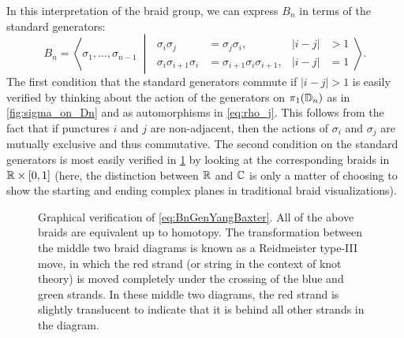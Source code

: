 In this interpretation of the braid group, we can express $B_n$ in terms of the standard generators:
\begin{equation}\label{eq:BnGenYangBaxter}
    B_n = \left\langle \sigma_1,\dots,\sigma_{n-1} \;\middle|\;
    \begin{aligned}
        \sigma_i\sigma_j &= \sigma_j\sigma_i, & |i-j|&>1 \\
        \sigma_i\sigma_{i+1}\sigma_i &= \sigma_{i+1}\sigma_i\sigma_{i+1}, & |i-j|&=1
    \end{aligned}
    \right\rangle.
\end{equation}
The first condition that the standard generators commute if $|i-j|>1$ is easily verified by thinking about the action of the generators on $\pi_1(\mathbb{D}_n)$ as in \cref{fig:sigma_on_Dn} and as automorphisms in \cref{eq:rho_j}. This follows from the fact that if punctures $i$ and $j$ are non-adjacent, then the actions of $\sigma_i$ and $\sigma_j$ are mutually exclusive and thus commutative. The second condition on the standard generators is most easily verified in \cref{fig:YB_criterion_verification} by looking at the corresponding braids in $\mathbb{R}\times[0,1]$ (here, the distinction between $\mathbb{R}$ and $\mathbb{C}$ is only a matter of choosing to show the starting and ending complex planes in traditional braid visualizations).
\begin{figure}[htbp]
    \centering
    
    \caption{Graphical verification of \cref{eq:BnGenYangBaxter}. All of the above braids are equivalent up to homotopy. The transformation between the middle two braid diagrams is known as a Reidmeister type-III move, in which the red strand (or string in the context of knot theory) is moved completely under the crossing of the blue and green strands. In these middle two diagrams, the red strand is slightly translucent to indicate that it is behind all other strands in the diagram.}\label{fig:YB_criterion_verification}
\end{figure}

